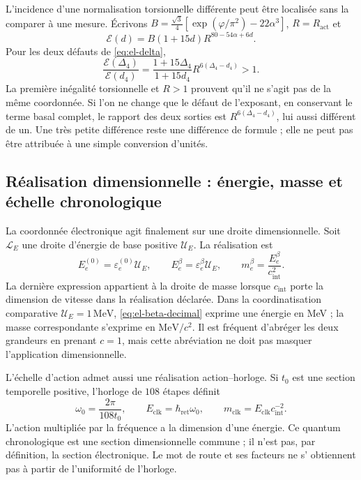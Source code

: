 L'incidence d'une normalisation torsionnelle différente peut être localisée sans la comparer à une mesure. Écrivons \(B=\frac{\sqrt3}{4}[\exp(\varphi/\pi^2)-22\alpha^3]\), \(R=R_{\mathrm{act}}\) et
\[
 \mathcal E(d)=B(1+15d)R^{80-54\alpha+6d}.
\]
Pour les deux défauts de \eqref{eq:el-delta},
\begin{equation}
 \frac{\mathcal E(\Delta_4)}{\mathcal E(d_4)}
 =\frac{1+15\Delta_4}{1+15d_4}
   R^{6(\Delta_4-d_4)}>1.
 \label{eq:el-normalizacion-beta}
\end{equation}
La première inégalité torsionnelle et \(R>1\) prouvent qu'il ne s'agit pas de la même coordonnée. Si l'on ne change que le défaut de l'exposant, en conservant le terme basal complet, le rapport des deux sorties est \(R^{6(\Delta_4-d_4)}\), lui aussi différent de un. Une très petite différence reste une différence de formule ; elle ne peut pas être attribuée à une simple conversion d'unités.

\subsection{Réalisation dimensionnelle : énergie, masse et échelle chronologique}

La coordonnée électronique agit finalement sur une droite dimensionnelle.
Soit \(\mathcal L_E\) une droite d'énergie de base positive
\(\mathcal U_E\). La réalisation est
\begin{equation}
 E_e^{(0)}=\varepsilon_e^{(0)}\mathcal U_E,\qquad
 E_e^\beta=\varepsilon_e^\beta\mathcal U_E,
 \qquad m_e^\beta=\frac{E_e^\beta}{c_{\mathrm{int}}^2}.
 \label{eq:el-dimensional}
\end{equation}
La dernière expression appartient à la droite de masse lorsque
\(c_{\mathrm{int}}\) porte la dimension de vitesse dans la réalisation
déclarée. Dans la coordinatisation comparative \(\mathcal U_E=1\,\mathrm{MeV}\),
\eqref{eq:el-beta-decimal} exprime une énergie en MeV ; la masse
correspondante s'exprime en \(\mathrm{MeV}/c^2\). Il est fréquent
d'abréger les deux grandeurs en prenant \(c=1\), mais cette abréviation ne
doit pas masquer l'application dimensionnelle.

L'échelle d'action admet aussi une réalisation action--horloge. Si
\(t_0\) est une section temporelle positive, l'horloge de \(108\) étapes
définit
\begin{equation}
 \omega_0=\frac{2\pi}{108t_0},\qquad
 E_{\mathrm{clk}}=\hbar_{\mathrm{ret}}\omega_0,\qquad
 m_{\mathrm{clk}}=E_{\mathrm{clk}}c_{\mathrm{int}}^{-2}.
 \label{eq:el-cuanto-reloj}
\end{equation}
L'action multipliée par la fréquence a la dimension d'une énergie. Ce quantum
chronologique est une section dimensionnelle commune ; il n'est pas, par définition,
la section électronique. Le mot de route et ses facteurs ne s'
obtiennent pas à partir de l'uniformité de l'horloge.

